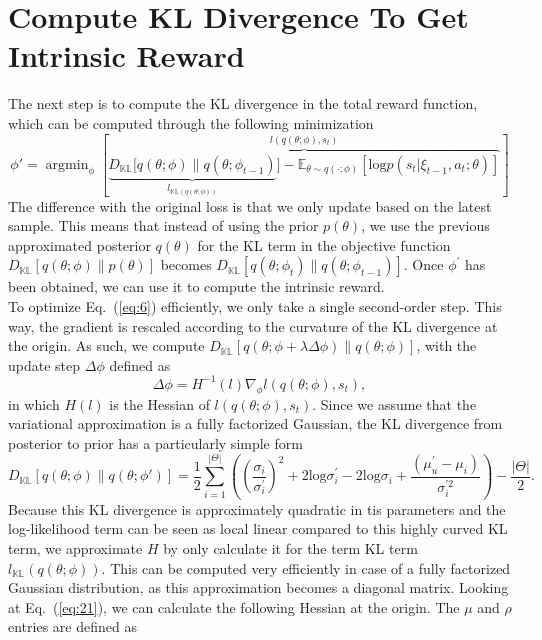 \documentclass{article}
\begin{document}
	\section{Compute  KL Divergence To Get Intrinsic Reward}
	\noindent The next step is to compute the KL divergence in the total reward function, which can be  computed through the following minimization
	\begin{equation}
	\phi' = \mathop{\text{argmin}}_{\phi}\left[\overbrace{\underbrace{D_{\mathds{KL}}[q(\theta;\phi)\|q(\theta;\phi_{t-1})}_{l_{\mathds{KL}(q(\theta;\phi))}}]-\mathds{E}_{\theta\sim q(\cdot;\phi)}[\text{log}p(s_t|\xi_{t-1},a_t;\theta)]}^{l(q(\theta;\phi),s_t)}\right]\label{eq:6}
	\end{equation}
	The difference with the original loss is that we only update based on the latest sample. This means that instead of using the prior $p(\theta)$, we use the previous approximated posterior $q(\theta)$ for the KL term in the objective function $D_\mathds{KL}[q(\theta;\phi)\|p(\theta)]$ becomes $D_\mathds{KL}[q(\theta;\phi_t)\|q(\theta;\phi_{t-1})]$. Once $\phi^{'}$ has been obtained, we can use it to compute the intrinsic reward.\\
	To optimize Eq.~(\ref{eq:6}) efficiently, we only take a single second-order step. This way, the gradient is rescaled according to the curvature of the KL divergence at the origin. As such, we compute $D_{\mathds{KL}}[q(\theta;\phi+\lambda\Delta\phi)\|q(\theta;\phi)]$, with the update step $\Delta\phi$ defined as
	\begin{equation}
	\Delta{\phi} = H^{-1}(l)\nabla_\phi l(q(\theta;\phi),s_t),
	\end{equation}
	in which $H(l)$ is the Hessian of $l(q(\theta;\phi),s_t)$. Since we assume that the variational approximation is a fully factorized Gaussian, the KL divergence from posterior to prior has a particularly simple form 
	\begin{equation}
	D_{\mathds{KL}}[q(\theta;\phi)\|q(\theta;\phi')] = \frac{1}{2}\sum_{i=1}^{|\Theta|}\left(\left(\frac{\sigma_i}{\sigma_{i}^{'}}\right)^2+2\text{log}\sigma_i^{'}-2\text{log}\sigma_i+\frac{(\mu_u^{'}-\mu_i)}{\sigma_i^{'2}}\right)-\frac{|\Theta|}{2}.\label{eq:21}
	\end{equation}
	Because this KL divergence is approximately quadratic in tis parameters and the log-likelihood term can be seen as local linear compared to this highly curved KL term, we approximate $H$ by only calculate it for the term KL term $l_{\mathds{KL}}(q(\theta;\phi))$. This can be computed very efficiently in case of a fully factorized Gaussian distribution, as this approximation becomes a diagonal matrix. Looking at Eq.~(\ref{eq:21}), we can calculate the following Hessian at the origin. The $\mu$ and $\rho$ entries are defined as
\end{document}
